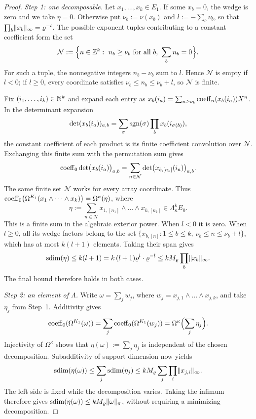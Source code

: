 \begin{proof}
\emph{Step 1: one decomposable.} Let $x_1,\dots,x_k\in E_1$. If some $x_b=0$, the wedge is zero and we take $\eta=0$.
Otherwise put $\nu_b:=\nu(x_b)$ and $l:=-\sum_b\nu_b$, so that
$\prod_b\lVert x_b\rVert_\infty=\varrho^{-l}$. The possible exponent tuples contributing to a constant coefficient form the set
\[
\mathcal N:=\Bigl\{n\in\Z^k:\ n_b\ge\nu_b\text{ for all }b,\ \sum_bn_b=0\Bigr\}.
\]
For such a tuple, the nonnegative integers $n_b-\nu_b$ sum to $l$. Hence $\mathcal N$ is empty if $l<0$;
if $l\ge0$, every coordinate satisfies $\nu_b\le n_b\le\nu_b+l$, so $\mathcal N$ is finite.

Fix $(i_1,\dots,i_k)\in\mathbb N^k$ and expand each entry as
$x_b(i_a)=\sum_{n\ge\nu_b}\operatorname{coeff}_n(x_b(i_a))X^n$. In the determinant expansion
\[
\det(x_b(i_a))_{a,b}=\sum_\sigma\operatorname{sgn}(\sigma)\prod_bx_b(i_{\sigma(b)}),
\]
the constant coefficient of each product is its finite coefficient convolution over $\mathcal N$.
Exchanging this finite sum with the permutation sum gives
\[
\operatorname{coeff}_0\det\bigl(x_b(i_a)\bigr)_{a,b}
=\sum_{n\in\mathcal N}\det\bigl(x_{b,[n_b]}(i_a)\bigr)_{a,b}.
\]
The same finite set $\mathcal N$ works for every array coordinate. Thus
$\operatorname{coeff}_0\bigl(\Omega^{K_1}(x_1\wedge\dots\wedge x_k)\bigr)=\Omega^\kappa(\eta)$, where
\[
\eta:=\sum_{n\in\mathcal N}x_{1,[n_1]}\wedge\dots\wedge x_{k,[n_k]}\in\Lambda^k_\kappa E_0.
\]
This is a finite sum in the algebraic exterior power. When $l<0$ it is zero. When $l\ge0$, all its wedge factors
belong to the set
$\{x_{b,[n]}:1\le b\le k,\ \nu_b\le n\le\nu_b+l\}$, which has at most $k(l+1)$ elements. Taking their span gives
\[
\operatorname{sdim}(\eta)\le k(l+1)=k\,(l+1)\varrho^l\cdot \varrho^{-l}\le kM_\varrho\prod_b\lVert x_b\rVert_\infty.
\]
The final bound therefore holds in both cases.

\emph{Step 2: an element of $\Lambda$.} Write $\omega=\sum_jw_j$, where
$w_j=x_{j,1}\wedge\dots\wedge x_{j,k}$, and take $\eta_j$ from Step~1. Additivity gives
\[
\operatorname{coeff}_0(\Omega^{K_1}(\omega))
=\sum_j\operatorname{coeff}_0(\Omega^{K_1}(w_j))
=\Omega^\kappa\Bigl(\sum_j\eta_j\Bigr).
\]
Injectivity of $\Omega^\kappa$ shows that $\eta(\omega):=\sum_j\eta_j$ is independent of the chosen decomposition.
Subadditivity of support dimension now yields
\[
\operatorname{sdim}(\eta(\omega))\le\sum_j\operatorname{sdim}(\eta_j)
\le kM_\varrho\sum_j\prod_i\lVert x_{j,i}\rVert_\infty.
\]
The left side is fixed while the decomposition varies. Taking the infimum therefore gives
$\operatorname{sdim}(\eta(\omega))\le kM_\varrho\lVert \omega\rVert_\pi$, without requiring a minimizing decomposition.


\end{proof}
